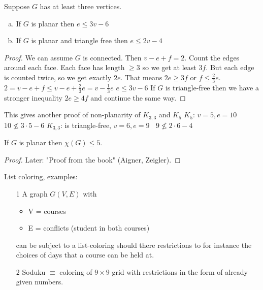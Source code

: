 \begin{corollary}\begin{minipage}[t]{\linewidth}
Suppose $G$ has at least three vertices.
\begin {enumerate}[(a)]
\item If {$G$} is planar then $e\leqslant3v-6$
\item  If {$G$} is planar and triangle free then $e\leqslant2v-4$
\end {enumerate}
\end {minipage}
\end {corollary}
\begin {proof} We can assume {$G$} is connected. Then $v-e+f=2$.
Count the edges around each face. Each face has length $\geqslant3$ so we get at least ${3f}$.
But each edge is counted twice, so we get exactly $2e$. That means 
$2e\geqslant3f$ or $f\leqslant\frac{2}{3}e$.
\newline
$2=v-e+f\leqslant v-e+ \frac{2}{3}e=v- \frac{1}{3}e$
\newline
$e\leqslant 3v-6$
\newline
If {$G$} is triangle-free then we have a stronger inequality
$2e\geqslant 4f$
and continue the same way.
\end {proof}
\begin {observation} This gives another proof of non-planarity of {$K_{3,3}$} and {$K_5$}
\newline
{$K_5$}: $v=5,e=10$    \: \:\:\:\:\: $10\nleq3\cdot5-6$
\newline
{$K_{3,3}$}: is triangle-free, $v=6, e=9 \: \: \: \: 9\nleq2\cdot6-4$
\end {observation}





\begin{theorem}
If $G$ is planar then $\chi(G) \leq 5$.
\end{theorem}
\begin{proof}
Later: "Proof from the book" (Aigner, Zeigler).
\end{proof}

List coloring, examples:
\begin{itemize}
\item[1]A graph $G(V,E)$ with
	\begin{itemize}
	\item V = courses
	\item E = conflicts (student in both courses)
	\end{itemize}
	can be subject to a list-coloring should there restrictions to for instance  the choices of days that a course can be held at. 
\item[2]Soduku $\equiv$ coloring of $9\times 9$ grid with restrictions in the form of already given numbers.
\end{itemize}

